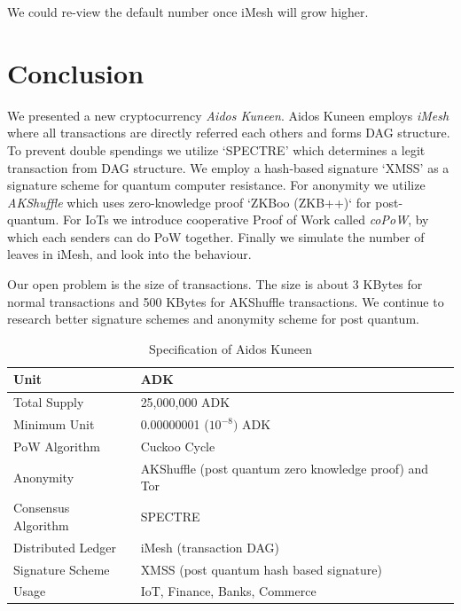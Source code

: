 \documentclass[a4paper,10pt,twocolumn]{article}
\begin{document}
 	 We could re-view the default number once iMesh will grow higher.

	  \section{Conclusion}
\label{sec:conc}

We presented  a new cryptocurrency \emph{Aidos Kuneen}.
Aidos Kuneen employs \emph{iMesh} where all transactions are directly referred each others and forms  DAG structure.
To prevent  double spendings we utilize `SPECTRE' which determines a legit transaction from DAG structure.
We employ a hash-based signature `XMSS' as a signature scheme for quantum computer resistance.
For anonymity we utilize \emph{AKShuffle} which uses zero-knowledge proof `ZKBoo (ZKB++)` for post-quantum.
For IoTs we introduce cooperative Proof of Work called \emph{coPoW}, by which each senders can do PoW together.
Finally we simulate the number of leaves in iMesh, and look into the behaviour.

Our open problem is the size of transactions. The size is about 3 KBytes for normal transactions and
500 KBytes for AKShuffle transactions. We continue to research better signature schemes and anonymity scheme
for post quantum.

\newpage
\begin{table}[htb]
	\caption{Specification of Aidos Kuneen}
    \label{tbl:spec}
	\begin{tabularx}{\linewidth}{XX} 
		\toprule
		Unit & ADK \\
		\midrule
Total Supply & 25,000,000 ADK \\ 
\midrule
Minimum Unit & 0.00000001 (\(10^{-8})\) ADK \\ 
\midrule
PoW Algorithm & Cuckoo Cycle\\ 
\midrule
Anonymity & AKShuffle (post quantum zero knowledge proof)  and Tor \\
\midrule
Consensus Algorithm & SPECTRE \\ \midrule
Distributed Ledger & iMesh (transaction DAG) \\
\midrule
Signature Scheme & XMSS (post quantum hash based signature)\\ 
\midrule
Usage &  IoT, Finance, Banks, Commerce \\ 
\bottomrule
\end{tabularx}
  \end{table}
\end{document}
